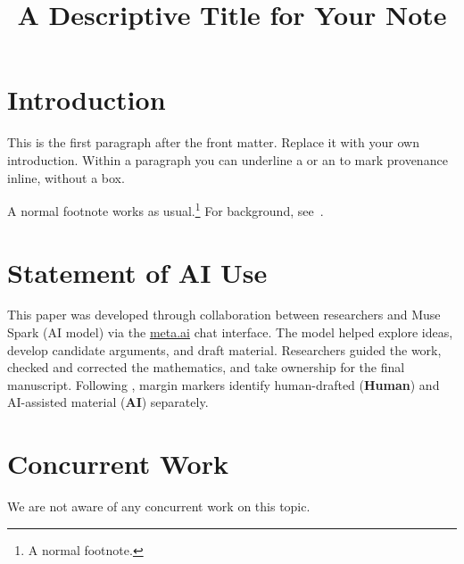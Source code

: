 \documentclass[11pt]{article}
\title[Short Title for the Running Head]{A Descriptive Title for Your Note}
\newcommand{\HumanLabel}{
({\bfseries\sffamily\color{humancolor!70}Human})
}
\newcommand{\AILabel}{
({\bfseries\sffamily\color{aicolor!70}AI})
}
\theoremstyle{plain}
\theoremstyle{definition}
\theoremstyle{remark}
\begin{document}
\maketitle


\section{Introduction}

This is the first paragraph after the front matter. Replace it with your
own introduction. Within a paragraph you can underline a
 or an  to mark
provenance inline, without a box.

A normal footnote works as usual.\footnote{A normal footnote.} For
background, see~\cite{example2024}.

\section*{Statement of AI Use}

\begin{humanblock}
This paper was developed through collaboration between researchers and Muse Spark (AI model) via the \href{http://meta.ai}{meta.ai} chat interface. The model helped explore ideas, develop candidate arguments, and draft material. Researchers guided the work, checked and corrected the mathematics, and take ownership for the final manuscript. Following \cite{schmitt2025extremal}, margin markers identify human-drafted \!\!\HumanLabel and AI-assisted material \!\!\AILabel separately.
\end{humanblock}

\section*{Concurrent Work}

\begin{humanblock}
We are not aware of any concurrent work on this topic.
\end{humanblock}

\end{document}
